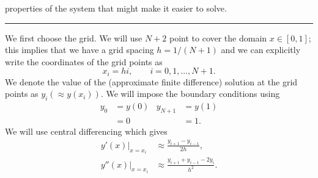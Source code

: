 \documentclass[10pt]{article}
\begin{document}
\begin{enumerate}
  properties of the system that might make it easier to solve.
  \begin{center}
    \rule{0.9\textwidth}{.1pt}
  \end{center}
  We first choose the grid. We will use $N+2$ point to cover the
  domain $x \in [0, 1]$; this implies that we have a grid spacing $h =
  1 / (N+1)$ and we can explicitly write the coordinates of the grid
  points as
  \begin{equation*}
    x_i = h i, \qquad i = 0, 1, \dots, N+1.
  \end{equation*}
  We denote the value of the (approximate finite difference) solution
  at the grid points as $y_i (\approx y(x_i))$. We will impose the
  boundary conditions using
  \begin{align*}
    y_0 & = y(0) & y_{N+1} & = y(1) \\
    & = 0 & & = 1.
  \end{align*}
  We will use central differencing which gives
  \begin{align*}
    y'(x)|_{x = x_i} & \approx \frac{y_{i+1} - y_{i-1}}{2 h}, \\
    y''(x)|_{x = x_i} & \approx \frac{y_{i+1} + y_{i-1} - 2
      y_i}{h^2}.
  \end{align*}


\end{enumerate}
\end{document}

